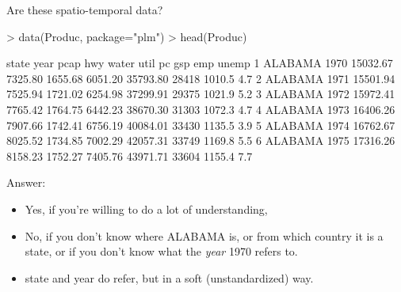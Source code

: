 \documentclass{beamer}
\begin{document}
\begin{frame}{Are these spatio-temporal data?}
\begin{tiny}
\begin{Schunk}
\begin{Sinput}
> data(Produc, package="plm")
> head(Produc)
\end{Sinput}
\begin{Soutput}
    state year     pcap     hwy   water    util       pc   gsp    emp unemp
1 ALABAMA 1970 15032.67 7325.80 1655.68 6051.20 35793.80 28418 1010.5   4.7
2 ALABAMA 1971 15501.94 7525.94 1721.02 6254.98 37299.91 29375 1021.9   5.2
3 ALABAMA 1972 15972.41 7765.42 1764.75 6442.23 38670.30 31303 1072.3   4.7
4 ALABAMA 1973 16406.26 7907.66 1742.41 6756.19 40084.01 33430 1135.5   3.9
5 ALABAMA 1974 16762.67 8025.52 1734.85 7002.29 42057.31 33749 1169.8   5.5
6 ALABAMA 1975 17316.26 8158.23 1752.27 7405.76 43971.71 33604 1155.4   7.7
\end{Soutput}
\end{Schunk}
\end{tiny}
Answer:
\pause
\begin{itemize}
\item {\color{red} Yes}, if you're willing to do a lot of understanding,
\item {\color{red} No}, if you don't know where ALABAMA is, or from which
country it is a state, or if you don't know what the {\em year} 1970 refers to.
\item state and year do refer, but in a soft (unstandardized) way.
\end{itemize}
\end{frame}

\end{document}
